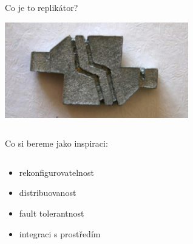 \documentclass{beamer}
\begin{document}
\begin{frame}{Co je to replikátor?}
    \begin{center}
        \includegraphics[width=0.6\textwidth]{img/replicator3}
    \end{center}

    \begin{columns}
        \begin{column}{0.5\textwidth}
            Co si bereme jako inspiraci:
        \end{column}
        \begin{column}{0.5\textwidth}
        \end{column}
    \end{columns}

    \begin{columns}
        \begin{column}{0.5\textwidth}
            \begin{itemize}
                \item rekonfigurovatelnost
                \item distribuovanost
                \item fault tolerantnost
                \item integraci s prostředím
            \end{itemize}
        \end{column}
        \begin{column}{0.5\textwidth}
        \end{column}
    \end{columns}
\end{frame}
\end{document}
